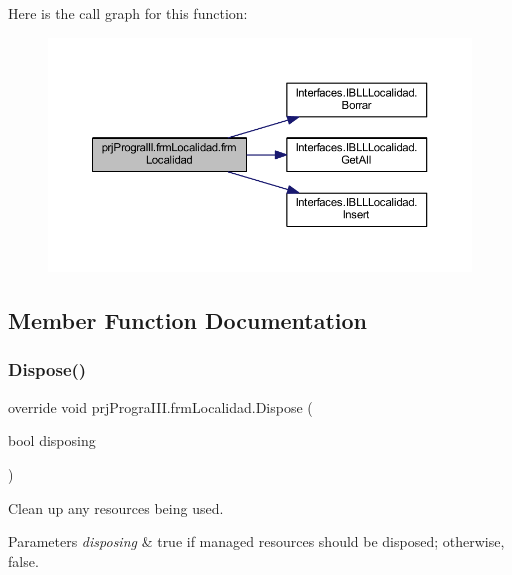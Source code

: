Here is the call graph for this function\+:
\nopagebreak
\begin{figure}[H]
\begin{center}
\leavevmode
\includegraphics[width=350pt]{classprj_progra_i_i_i_1_1frm_localidad_ad5a3af80840dc9ea53d5bddc347a61eb_cgraph}
\end{center}
\end{figure}


\subsection{Member Function Documentation}
\hypertarget{classprj_progra_i_i_i_1_1frm_localidad_ad30abf0e0173efdd69cacb3f1deba093}{}\label{classprj_progra_i_i_i_1_1frm_localidad_ad30abf0e0173efdd69cacb3f1deba093} 
\subsubsection{\texorpdfstring{Dispose()}{Dispose()}}
{\footnotesize\ttfamily override void prj\+Progra\+I\+I\+I.\+frm\+Localidad.\+Dispose (\begin{DoxyParamCaption}\item[{bool}]{disposing }\end{DoxyParamCaption})\hspace{0.3cm}{\ttfamily [protected]}}



Clean up any resources being used. 


\begin{DoxyParams}{Parameters}
{\em disposing} & true if managed resources should be disposed; otherwise, false.\\
\hline
\end{DoxyParams}


